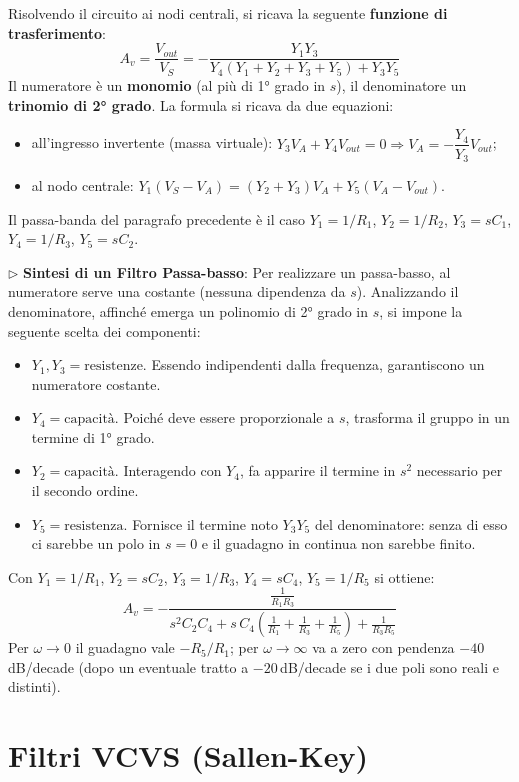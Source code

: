 Risolvendo il circuito ai nodi centrali, si ricava la seguente \textbf{funzione di trasferimento}:
\begin{equation}
A_v = \frac{V_{out}}{V_S} = - \frac{Y_1 Y_3}{Y_4(Y_1+Y_2+Y_3+Y_5) + Y_3 Y_5}
\end{equation}
Il numeratore è un \textbf{monomio} (al più di 1° grado in $s$), il denominatore un \textbf{trinomio di 2° grado}. La formula si ricava da due equazioni:
\begin{itemize}[itemsep=0.5ex]
    \item all'ingresso invertente (massa virtuale): $Y_3 V_A + Y_4 V_{out} = 0 \Rightarrow V_A = -\dfrac{Y_4}{Y_3}V_{out}$;
    \item al nodo centrale: $Y_1(V_S - V_A) = (Y_2 + Y_3)V_A + Y_5(V_A - V_{out})$.
\end{itemize}
Il passa-banda del paragrafo precedente è il caso $Y_1 = 1/R_1$, $Y_2 = 1/R_2$, $Y_3 = sC_1$, $Y_4 = 1/R_3$, $Y_5 = sC_2$.

$\triangleright$ \textbf{Sintesi di un Filtro Passa-basso}: Per realizzare un passa-basso, al numeratore serve una costante (nessuna dipendenza da $s$). Analizzando il denominatore, affinché emerga un polinomio di 2° grado in $s$, si impone la seguente scelta dei componenti:
\begin{itemize}[itemsep=1ex]
    \item $Y_1, Y_3 = \text{resistenze}$. Essendo indipendenti dalla frequenza, garantiscono un numeratore costante.
    \item $Y_4 = \text{capacit\`a}$. Poiché deve essere proporzionale a $s$, trasforma il gruppo in un termine di 1° grado.
    \item $Y_2 = \text{capacit\`a}$. Interagendo con $Y_4$, fa apparire il termine in $s^2$ necessario per il secondo ordine.
    \item $Y_5 = \text{resistenza}$. Fornisce il termine noto $Y_3Y_5$ del denominatore: senza di esso ci sarebbe un polo in $s=0$ e il guadagno in continua non sarebbe finito.
\end{itemize}
Con $Y_1 = 1/R_1$, $Y_2 = sC_2$, $Y_3 = 1/R_3$, $Y_4 = sC_4$, $Y_5 = 1/R_5$ si ottiene:
\[
A_v = -\frac{\frac{1}{R_1R_3}}{s^2 C_2 C_4 + s\,C_4\left(\frac{1}{R_1}+\frac{1}{R_3}+\frac{1}{R_5}\right) + \frac{1}{R_3R_5}}
\]
Per $\omega \to 0$ il guadagno vale $-R_5/R_1$; per $\omega \to \infty$ va a zero con pendenza $-40$\,dB/decade (dopo un eventuale tratto a $-20$\,dB/decade se i due poli sono reali e distinti).


\section{Filtri VCVS (Sallen-Key)}

